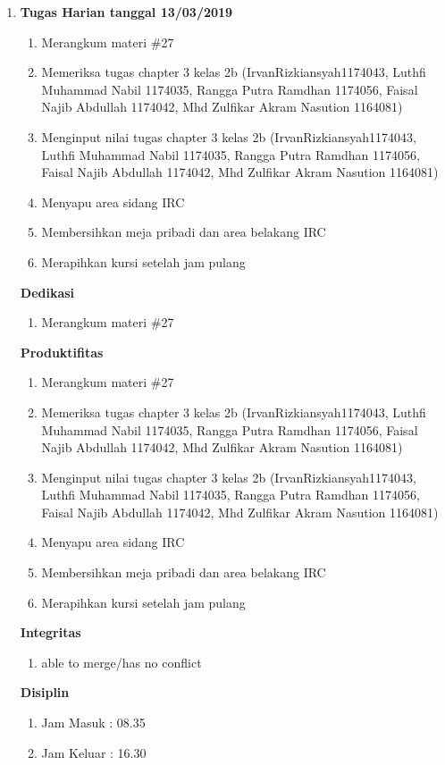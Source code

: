 \begin{enumerate}
\item \textbf{Tugas Harian tanggal 13/03/2019}
\begin{enumerate}
\item Merangkum materi \#27
\item Memeriksa tugas chapter 3 kelas 2b (IrvanRizkiansyah1174043, Luthfi Muhammad Nabil 1174035, Rangga Putra Ramdhan 1174056, Faisal Najib Abdullah 1174042, Mhd Zulfikar Akram Nasution 1164081)
\item Menginput nilai tugas chapter 3 kelas 2b (IrvanRizkiansyah1174043, Luthfi Muhammad Nabil 1174035, Rangga Putra Ramdhan 1174056, Faisal Najib Abdullah 1174042, Mhd Zulfikar Akram Nasution 1164081)
\item Menyapu area sidang IRC
\item Membersihkan meja pribadi dan area belakang IRC
\item Merapihkan kursi setelah jam pulang 
\end{enumerate}

\textbf{Dedikasi}
\begin{enumerate}
\item Merangkum materi \#27
\end{enumerate}

\textbf{Produktifitas}
\begin{enumerate}
\item Merangkum materi \#27
\item Memeriksa tugas chapter 3 kelas 2b (IrvanRizkiansyah1174043, Luthfi Muhammad Nabil 1174035, Rangga Putra Ramdhan 1174056, Faisal Najib Abdullah 1174042, Mhd Zulfikar Akram Nasution 1164081)
\item Menginput nilai tugas chapter 3 kelas 2b (IrvanRizkiansyah1174043, Luthfi Muhammad Nabil 1174035, Rangga Putra Ramdhan 1174056, Faisal Najib Abdullah 1174042, Mhd Zulfikar Akram Nasution 1164081)
\item Menyapu area sidang IRC
\item Membersihkan meja pribadi dan area belakang IRC
\item Merapihkan kursi setelah jam pulang 
\end{enumerate}

\textbf{Integritas}
\begin{enumerate}
\item able to merge/has no conflict
\end{enumerate}

\textbf{Disiplin}
\begin{enumerate}
\item Jam Masuk : 08.35
\item Jam Keluar : 16.30
\end{enumerate}


\end{enumerate}
